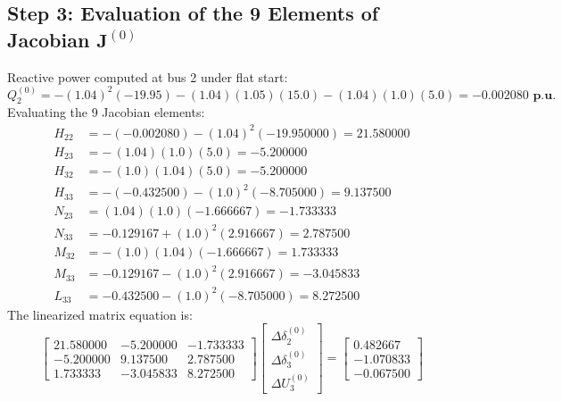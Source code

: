 \documentclass[12pt,a4paper,oneside]{report}
\begin{document}
\subsection{Step 3: Evaluation of the 9 Elements of Jacobian $\mathbf{J}^{(0)}$}
Reactive power computed at bus 2 under flat start:
\begin{equation}
Q_2^{(0)} = -(1.04)^2(-19.95) - (1.04)(1.05)(15.0) - (1.04)(1.0)(5.0) = \mathbf{-0.002080\text{ p.u.}}
\end{equation}
Evaluating the 9 Jacobian elements:
\begin{align}
H_{22} &= -(-0.002080) - (1.04)^2 (-19.950000) = \mathbf{21.580000} \\
H_{23} &= -\, (1.04)(1.0)(5.0) = \mathbf{-5.200000} \\
H_{32} &= -\, (1.0)(1.04)(5.0) = \mathbf{-5.200000} \\
H_{33} &= -(-0.432500) - (1.0)^2 (-8.705000) = \mathbf{9.137500} \\
N_{23} &= (1.04)(1.0)(-1.666667) = \mathbf{-1.733333} \\
N_{33} &= -0.129167 + (1.0)^2 (2.916667) = \mathbf{2.787500} \\
M_{32} &= -\, (1.0)(1.04)(-1.666667) = \mathbf{1.733333} \\
M_{33} &= -0.129167 - (1.0)^2 (2.916667) = \mathbf{-3.045833} \\
L_{33} &= -0.432500 - (1.0)^2 (-8.705000) = \mathbf{8.272500}
\end{align}
The linearized matrix equation is:
\begin{equation}
\begin{bmatrix}
21.580000 & -5.200000 & -1.733333 \\
-5.200000 & 9.137500 & 2.787500 \\
1.733333 & -3.045833 & 8.272500
\end{bmatrix}
\begin{bmatrix}
\Delta \delta_2^{(0)} \\[3pt]
\Delta \delta_3^{(0)} \\[3pt]
\Delta U_3^{(0)}
\end{bmatrix}
=
\begin{bmatrix}
0.482667 \\[3pt]
-1.070833 \\[3pt]
-0.067500
\end{bmatrix}
\end{equation}
\end{document}
